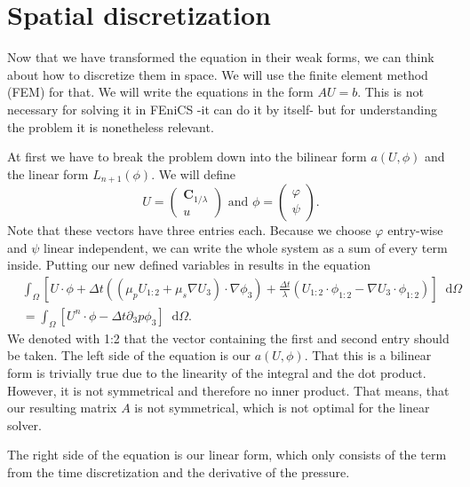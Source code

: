 \documentclass[12pt,a4paper,twoside, open=right]{scrreprt}
\theoremstyle{definition}
\theoremstyle{plain}
\newcommand{\bfC}{\bm{C}}
\newcommand{\D}{\mathop{}\!\mathrm{d}}
\begin{document}
\section{Spatial discretization}
Now that we have transformed the equation in their weak forms, we can think about how to discretize them in space. We will use the finite element method (FEM) for that. We will write the equations in the form $AU=b$. This is not necessary for solving it in FEniCS -it can do it by itself- but for understanding the problem it is nonetheless relevant. 
\par 
At first we have to break the problem down into the bilinear form $a(U,\phi)$ and the linear form $L_{n+1}(\phi)$. We will define 
\begin{equation}
   U=\begin{pmatrix}
   \bfC_{1/\lambda}\\u
   \end{pmatrix} \text{ and } 
   \phi=\begin{pmatrix}
   \varphi\\\psi
   \end{pmatrix}.
\end{equation}
Note that these vectors have three entries each. Because we choose $\varphi$ entry-wise and $\psi$ linear independent, we can write the whole system as a sum of every term inside. Putting our new defined variables in results in the equation
\begin{align}
    &\int_\Omega[U\cdot\phi+\Delta t((\mu_pU_{1:2}+\mu_s\nabla U_3)\cdot\nabla\phi_3)+\frac{\Delta t}{\lambda}(U_{1:2}\cdot\phi_{1:2}-\nabla U_3\cdot\phi_{1:2})]\D\Omega\\
    &=\int_\Omega [U^n\cdot\phi-\Delta t\partial_3 p\phi_3]\D\Omega.
\end{align}
We denoted with 1:2 that the vector containing the first and second entry should be taken. The left side of the equation is our $a(U,\phi)$. That this is a bilinear form is trivially true due to the linearity of the integral and the dot product. However, it is not symmetrical and therefore no inner product. That means, that our resulting matrix $A$ is not symmetrical, which is not optimal for the linear solver.\par 
The right side of the equation is our linear form, which only consists of the term from the time discretization and the derivative of the pressure.
\end{document}
